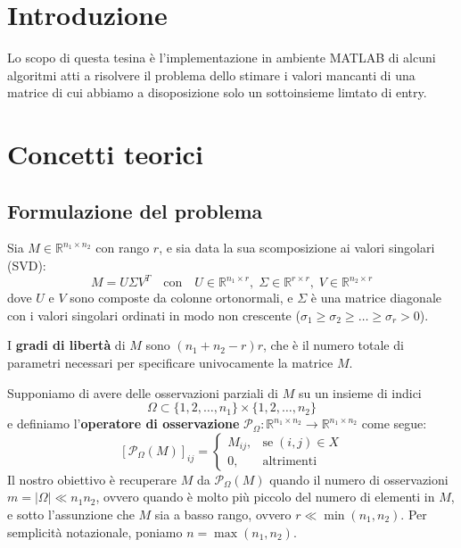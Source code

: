 \documentclass[12pt,a4paper]{report}
\begin{document}

\chapter{Introduzione}

Lo scopo di questa tesina è l'implementazione in ambiente MATLAB di alcuni algoritmi
atti a risolvere il problema dello stimare i valori mancanti di una matrice di cui
abbiamo a disoposizione solo un sottoinsieme limtato di entry.

{\let\clearpage\relax\chapter{Concetti teorici}}

\section{Formulazione del problema}

Sia $M\in\mathbb{R}^{n_1\times n_2}$ con rango $r$, e sia data la sua scomposizione ai valori
singolari (SVD):
$$M=U\Sigma V^T \quad\text{con}\quad U\in\mathbb{R}^{n_1\times r},
\;\Sigma\in\mathbb{R}^{r\times r},\;V\in\mathbb{R}^{n_2\times r}$$
dove $U$ e $V$ sono composte da colonne ortonormali, e $\Sigma$ è una matrice
diagonale con i valori singolari ordinati in modo non crescente
($\sigma_1\geq\sigma_2\geq\ldots\geq\sigma_r>0$).

I \textbf{gradi di libertà} di $M$ sono $(n_1 + n_2 - r)r$, che è il numero totale di parametri
necessari per specificare univocamente la matrice $M$.

\newpage

Supponiamo di avere delle osservazioni parziali di $M$ su un insieme di indici
$$\Omega \subset \{1,2,\ldots,n_1\}\times\{1,2,\ldots,n_2\}$$
e definiamo l'\textbf{operatore di osservazione}
$\mathcal{P}_{\Omega}:\mathbb{R}^{n_1\times n_2}\to\mathbb{R}^{n_1\times n_2}$ come segue:
$$\left[\mathcal{P}_{\Omega}(M)\right] _{ij}=\left\{\begin{matrix}M_{ij}, & \text{se}\; (i,j)\in X \\ 0, & \text{altrimenti}\end{matrix}\right.$$
Il nostro obiettivo è recuperare $M$ da $\mathcal{P}_{\Omega}(M)$
quando il numero di osservazioni\\ $m = |\Omega| \ll n_1 n_2$, ovvero quando
è molto più piccolo del numero di elementi in $M$, e sotto l'assunzione che $M$
sia a basso rango, ovvero $r\ll\min(n_1,n_2)$.
Per semplicità notazionale, poniamo $n=\max(n_1,n_2)$.
\end{document}

